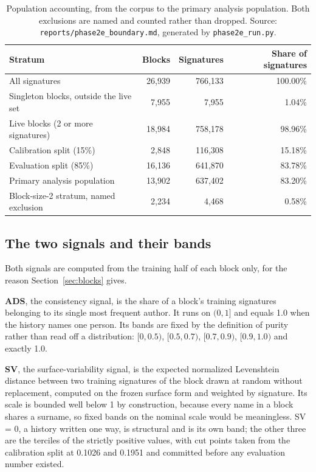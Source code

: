 \documentclass[11pt]{article}
\begin{document}
\begin{table}[htbp]
\centering
\caption{Population accounting, from the corpus to the primary analysis
population. Both exclusions are named and counted rather than dropped.
Source: \texttt{reports/phase2e\_boundary.md}, generated by
\texttt{phase2e\_run.py}.}
\label{tab:population}
\small
\begin{tabular}{lrrr}
\toprule
Stratum & Blocks & Signatures & Share of signatures \\
\midrule
All signatures & 26{,}939 & 766{,}133 & 100.00\% \\
Singleton blocks, outside the live set & 7{,}955 & 7{,}955 & 1.04\% \\
Live blocks (2 or more signatures) & 18{,}984 & 758{,}178 & 98.96\% \\
\quad Calibration split (15\%) & 2{,}848 & 116{,}308 & 15.18\% \\
\quad Evaluation split (85\%) & 16{,}136 & 641{,}870 & 83.78\% \\
\quad\quad Primary analysis population & 13{,}902 & 637{,}402 & 83.20\% \\
\quad\quad Block-size-2 stratum, named exclusion & 2{,}234 & 4{,}468 & 0.58\% \\
\bottomrule
\end{tabular}
\end{table}

\subsection{The two signals and their bands}
\label{sec:signals}

Both signals are computed from the training half of each block only, for the
reason Section~\ref{sec:blocks} gives.

\textbf{ADS}, the consistency signal, is the share of a block's training
signatures belonging to its single most frequent author. It runs on $(0, 1]$
and equals 1.0 when the history names one person. Its bands are fixed by the
definition of purity rather than read off a distribution: $[0, 0.5)$,
$[0.5, 0.7)$, $[0.7, 0.9)$, $[0.9, 1.0)$ and exactly 1.0.

\textbf{SV}, the surface-variability signal, is the expected normalized
Levenshtein distance between two training signatures of the block drawn at
random without replacement, computed on the frozen surface form and weighted
by signature. Its scale is bounded well below 1 by construction, because every
name in a block shares a surname, so fixed bands on the nominal scale would be
meaningless. SV = 0, a history written one way, is structural and is its own
band; the other three are the terciles of the strictly positive values, with
cut points taken from the calibration split at 0.1026 and 0.1951 and committed
before any evaluation number existed.
\end{document}
